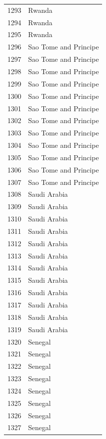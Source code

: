 \documentclass[
  letterpaper,
  DIV=11,
  numbers=noendperiod]{scrreprt}
\begin{document}
\begin{tabular}{ll}
1293 &                    Rwanda \\
1294 &                    Rwanda \\
1295 &                    Rwanda \\
1296 &     Sao Tome and Principe \\
1297 &     Sao Tome and Principe \\
1298 &     Sao Tome and Principe \\
1299 &     Sao Tome and Principe \\
1300 &     Sao Tome and Principe \\
1301 &     Sao Tome and Principe \\
1302 &     Sao Tome and Principe \\
1303 &     Sao Tome and Principe \\
1304 &     Sao Tome and Principe \\
1305 &     Sao Tome and Principe \\
1306 &     Sao Tome and Principe \\
1307 &     Sao Tome and Principe \\
1308 &              Saudi Arabia \\
1309 &              Saudi Arabia \\
1310 &              Saudi Arabia \\
1311 &              Saudi Arabia \\
1312 &              Saudi Arabia \\
1313 &              Saudi Arabia \\
1314 &              Saudi Arabia \\
1315 &              Saudi Arabia \\
1316 &              Saudi Arabia \\
1317 &              Saudi Arabia \\
1318 &              Saudi Arabia \\
1319 &              Saudi Arabia \\
1320 &                   Senegal \\
1321 &                   Senegal \\
1322 &                   Senegal \\
1323 &                   Senegal \\
1324 &                   Senegal \\
1325 &                   Senegal \\
1326 &                   Senegal \\
1327 &                   Senegal \\

\end{tabular}
\end{document}
